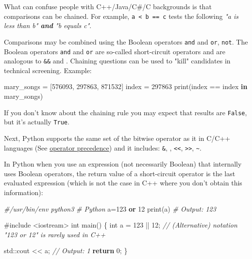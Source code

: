 \documentclass[
]{article}
\newenvironment{Shaded}{}{}
\newcommand{\BuiltInTok}[1]{#1}
\newcommand{\CommentTok}[1]{\textcolor[rgb]{0.38,0.63,0.69}{\textit{#1}}}
\newcommand{\ControlFlowTok}[1]{\textcolor[rgb]{0.00,0.44,0.13}{\textbf{#1}}}
\newcommand{\DataTypeTok}[1]{\textcolor[rgb]{0.56,0.13,0.00}{#1}}
\newcommand{\DecValTok}[1]{\textcolor[rgb]{0.25,0.63,0.44}{#1}}
\newcommand{\ImportTok}[1]{#1}
\newcommand{\KeywordTok}[1]{\textcolor[rgb]{0.00,0.44,0.13}{\textbf{#1}}}
\newcommand{\NormalTok}[1]{#1}
\newcommand{\OperatorTok}[1]{\textcolor[rgb]{0.40,0.40,0.40}{#1}}
\newcommand{\PreprocessorTok}[1]{\textcolor[rgb]{0.74,0.48,0.00}{#1}}
\begin{document}
What can confuse people with C++/Java/C\#/C backgrounds is that
comparisons can be chained. For example,
\texttt{a\ \textless{}\ b\ ==\ c} tests the following \emph{"a is less
than b" \textbf{and} "b equals c"}.

Comparisons may be combined using the Boolean operators \texttt{and} and
\texttt{or}, \texttt{not}. The Boolean operators \texttt{and} and
\texttt{or} are so-called short-circuit operators and are analogous to
\texttt{\&\&} and \texttt{\textbar{}\textbar{}}. Chaining questions can
be used to "kill" candidates in technical screening. Example:

\begin{Shaded}
\begin{Highlighting}[]
\NormalTok{mary\_songs }\OperatorTok{=}\NormalTok{ [}\DecValTok{576093}\NormalTok{, }\DecValTok{297863}\NormalTok{, }\DecValTok{871532}\NormalTok{]}
\NormalTok{index }\OperatorTok{=} \DecValTok{297863}
\BuiltInTok{print}\NormalTok{(index }\OperatorTok{==}\NormalTok{ index }\KeywordTok{in}\NormalTok{ mary\_songs)}
\end{Highlighting}
\end{Shaded}

If you don't know about the chaining rule you may expect that results
are \texttt{False}, but it's actually \texttt{True}.

Next, Python supports the same set of the bitwise operator as it in
C/C++ languages (See
\href{https://docs.python.org/3.13/reference/expressions.html\#operator-precedence}{operator
precedence}) and it includes: \texttt{\&}, \texttt{\textbar{}},
\texttt{\textless{}\textless{}}, \texttt{\textgreater{}\textgreater{}},
\texttt{\textasciitilde{}}.

In Python when you use an expression (not necessarily Boolean) that
internally uses Boolean operators, the return value of a short-circuit
operator is the last evaluated expression (which is not the case in C++
where you don't obtain this information):

\begin{Shaded}
\begin{Highlighting}[]
\CommentTok{\#/usr/bin/env python3}
\CommentTok{\# Python}
\NormalTok{a}\OperatorTok{=}\DecValTok{123} \KeywordTok{or} \DecValTok{12}
\BuiltInTok{print}\NormalTok{(a)}
\CommentTok{\# Output: 123}
\end{Highlighting}
\end{Shaded}

\begin{Shaded}
\begin{Highlighting}[]
\PreprocessorTok{\#include }\ImportTok{\textless{}iostream\textgreater{}}
\DataTypeTok{int}\NormalTok{ main}\OperatorTok{()} \OperatorTok{\{}
  \DataTypeTok{int}\NormalTok{ a }\OperatorTok{=} \DecValTok{123} \OperatorTok{||} \DecValTok{12}\OperatorTok{;}  
  \CommentTok{// (Alternative) notation "123 or 12" is rarely used in C++}

  \BuiltInTok{std::}\NormalTok{cout}\OperatorTok{ \textless{}\textless{}}\NormalTok{ a}\OperatorTok{;}
  \CommentTok{// Output: 1}
  \ControlFlowTok{return} \DecValTok{0}\OperatorTok{;}
\OperatorTok{\}}
\end{Highlighting}
\end{Shaded}
\end{document}
